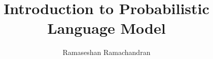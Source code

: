 
\usepackage{cleveref}

\title{Introduction to Probabilistic Language Model}
\author[]{Ramaseshan Ramachandran}
\date{}

	\maketitle
	


	
	
	
	


